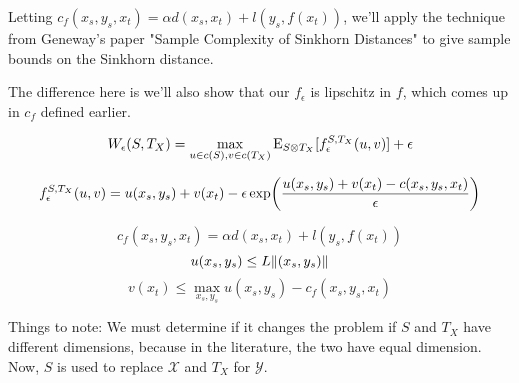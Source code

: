 %
%
%

Letting $c_f(x_s,y_s,x_t) = \alpha d(x_s,x_t) + l(y_s,f(x_t))$, we'll apply the technique from Geneway's paper "Sample Complexity of Sinkhorn Distances" to give sample bounds on the Sinkhorn distance.

The difference here is we'll also show that our $f_{\epsilon}$ is lipschitz in $f$, which comes up in $c_f$ defined earlier.

$$W_{\epsilon}(S,T_X) = \max_{u\in c(S),v\in c(T_X)} \mathrm{E}_{S\otimes T_X} [f_{\epsilon}^{S,T_X}(u,v)]+\epsilon$$

$$f_{\epsilon}^{S,T_X}(u,v) = u(x_s,y_s)+v(x_t)-\epsilon \exp \paren*{\frac{u(x_s,y_s)+v(x_t)-c(x_s,y_s,x_t)}{\epsilon}}$$

$$c_f(x_s,y_s,x_t) = \alpha d(x_s,x_t)+l(y_s,f(x_t))$$
$$u(x_s,y_s)\leq L\lVert(x_s,y_s)\rVert$$
$$v(x_t) \leq \max_{x_s,y_s} u(x_s,y_s)-c_f(x_s,y_s,x_t)$$

Things to note:
We must determine if it changes the problem if $S$ and $T_X$ have different dimensions, because in the literature, the two have equal dimension. Now, $S$ is used to replace $\mathcal{X}$ and $T_X$ for $\mathcal{Y}$.


